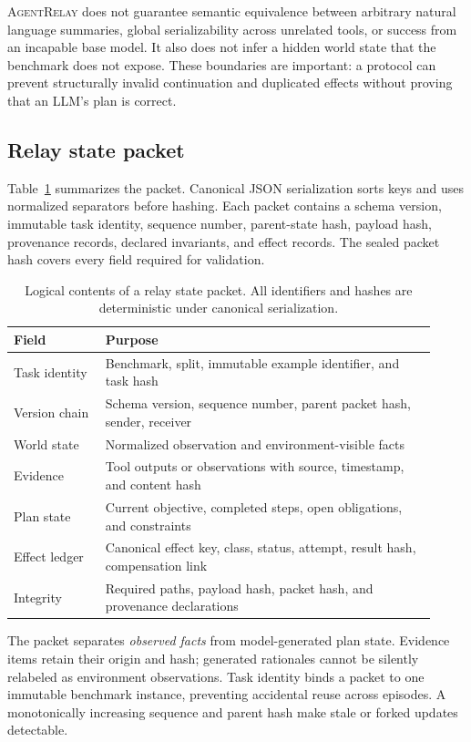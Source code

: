 \documentclass[10pt]{article}
\newcommand{\system}{\textsc{AgentRelay}}
\begin{document}
\system{} does not guarantee semantic equivalence between arbitrary natural
language summaries, global serializability across unrelated tools, or success
from an incapable base model. It also does not infer a hidden world state that
the benchmark does not expose. These boundaries are important: a protocol can
prevent structurally invalid continuation and duplicated effects without
proving that an LLM's plan is correct.

\subsection{Relay state packet}
\label{sec:packet}

Table~\ref{tab:packet} summarizes the packet. Canonical JSON serialization
sorts keys and uses normalized separators before hashing. Each packet contains
a schema version, immutable task identity, sequence number, parent-state hash,
payload hash, provenance records, declared invariants, and effect records.
The sealed packet hash covers every field required for validation.

\begin{table}[t]
\centering
\small
\caption{Logical contents of a relay state packet. All identifiers and hashes
are deterministic under canonical serialization.}
\label{tab:packet}
\begin{tabular}{p{0.20\linewidth}p{0.72\linewidth}}
\toprule
Field & Purpose \\
\midrule
Task identity & Benchmark, split, immutable example identifier, and task hash \\
Version chain & Schema version, sequence number, parent packet hash, sender, receiver \\
World state & Normalized observation and environment-visible facts \\
Evidence & Tool outputs or observations with source, timestamp, and content hash \\
Plan state & Current objective, completed steps, open obligations, and constraints \\
Effect ledger & Canonical effect key, class, status, attempt, result hash, compensation link \\
Integrity & Required paths, payload hash, packet hash, and provenance declarations \\
\bottomrule
\end{tabular}
\end{table}

The packet separates \emph{observed facts} from model-generated plan state.
Evidence items retain their origin and hash; generated rationales cannot be
silently relabeled as environment observations. Task identity binds a packet
to one immutable benchmark instance, preventing accidental reuse across
episodes. A monotonically increasing sequence and parent hash make stale or
forked updates detectable.
\end{document}
